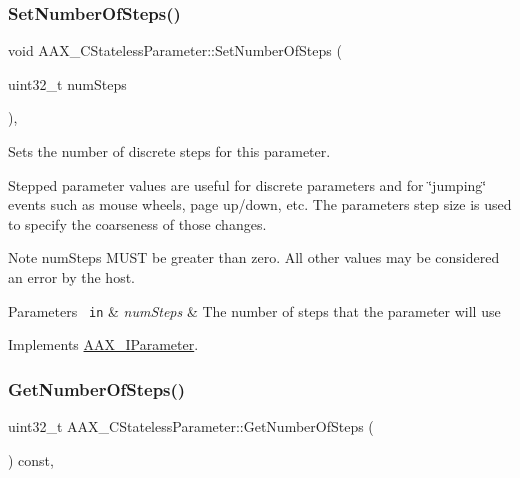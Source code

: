 \mbox{\label{a01541_a5bf5527cf5ef918923dd21f4ebee6179}} 
\subsubsection{\texorpdfstring{SetNumberOfSteps()}{SetNumberOfSteps()}}
{\footnotesize\ttfamily void A\+A\+X\+\_\+\+C\+Stateless\+Parameter\+::\+Set\+Number\+Of\+Steps (\begin{DoxyParamCaption}\item[{uint32\+\_\+t}]{num\+Steps }\end{DoxyParamCaption})\hspace{0.3cm}{\ttfamily [inline]}, {\ttfamily [virtual]}}



Sets the number of discrete steps for this parameter. 

Stepped parameter values are useful for discrete parameters and for \char`\"{}jumping\char`\"{} events such as mouse wheels, page up/down, etc. The parameter\textquotesingle{}s step size is used to specify the coarseness of those changes.

\begin{DoxyNote}{Note}
num\+Steps M\+U\+ST be greater than zero. All other values may be considered an error by the host.
\end{DoxyNote}

\begin{DoxyParams}[1]{Parameters}
\mbox{\texttt{ in}}  & {\em num\+Steps} & The number of steps that the parameter will use \\
\hline
\end{DoxyParams}


Implements \mbox{\hyperlink{a01857_ac81903d0388a03045a57dd4c455b6f02}{A\+A\+X\+\_\+\+I\+Parameter}}.

\mbox{\label{a01541_af45ddd2fc08c33ce5635f0e01ea1e814}} 
\subsubsection{\texorpdfstring{GetNumberOfSteps()}{GetNumberOfSteps()}}
{\footnotesize\ttfamily uint32\+\_\+t A\+A\+X\+\_\+\+C\+Stateless\+Parameter\+::\+Get\+Number\+Of\+Steps (\begin{DoxyParamCaption}{ }\end{DoxyParamCaption}) const\hspace{0.3cm}{\ttfamily [inline]}, {\ttfamily [virtual]}}



